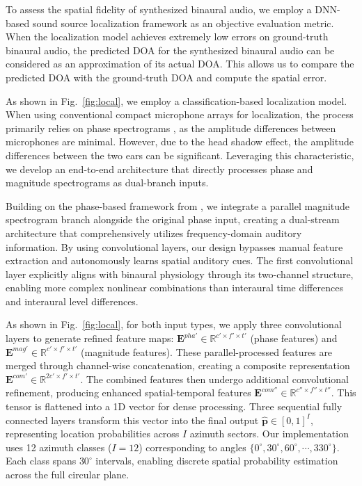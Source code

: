 \documentclass{IEEEtran}
\begin{document}
    To assess the spatial fidelity of synthesized binaural audio, we employ a DNN-based sound source localization framework \cite{feng2025audiospa} as an objective evaluation metric. When the localization model achieves extremely low errors on ground-truth binaural audio, the predicted DOA for the synthesized binaural audio can be considered as an approximation of its actual DOA. This allows us to compare the predicted DOA with the ground-truth DOA and compute the spatial error.

As shown in Fig.~\ref{fig:local}, we employ a classification-based localization model. When using conventional compact microphone arrays for localization, the process primarily relies on phase spectrograms \cite{feng2025eliminating}, as the amplitude differences between microphones are minimal. However, due to the head shadow effect, the amplitude differences between the two ears can be significant. Leveraging this characteristic, we develop an end-to-end architecture that directly processes phase and magnitude spectrograms as dual-branch inputs.

Building on the phase-based framework from \cite{feng2025eliminating}, we integrate a parallel magnitude spectrogram branch alongside the original phase input, creating a dual-stream architecture that comprehensively utilizes frequency-domain auditory information. By using convolutional layers, our design bypasses manual feature extraction and autonomously learns spatial auditory cues. The first convolutional layer explicitly aligns with binaural physiology through its two-channel structure, enabling more complex nonlinear combinations than interaural time differences and interaural level differences.



As shown in Fig.~\ref{fig:local}, for both input types, we apply three convolutional layers to generate refined feature maps: $\mathbf{E}^{pha'} \in \mathbb{R}^{c' \times f' \times t'}$ (phase features) and $\mathbf{E}^{mag'} \in \mathbb{R}^{c' \times f' \times t'}$ (magnitude features). These parallel-processed features are merged through channel-wise concatenation, creating a composite representation $\mathbf{E}^{com'} \in \mathbb{R}^{2c' \times f' \times t'}$. The combined features then undergo additional convolutional refinement, producing enhanced spatial-temporal features $\mathbf{E}^{com''} \in \mathbb{R}^{c'' \times f'' \times t''}$. This tensor is flattened into a 1D vector for dense processing. Three sequential fully connected layers transform this vector into the final output $\hat{\mathbf{p}} \in [0, 1]^{I}$, representing location probabilities across $I$ azimuth sectors. Our implementation uses 12 azimuth classes ($I=12$) corresponding to angles $\{0^{\circ}, 30^{\circ}, 60^{\circ}, \cdots, 330^{\circ}\}$. Each class spans $30^{\circ}$ intervals, enabling discrete spatial probability estimation across the full circular plane.
\end{document}
